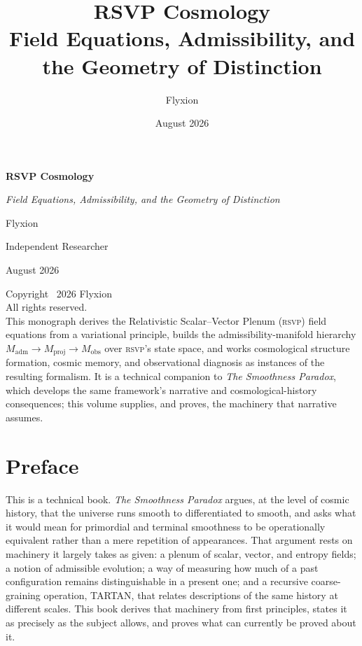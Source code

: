 \documentclass[12pt,a4paper,twoside,openright]{book}
\title{%
  \Huge\bfseries
  RSVP Cosmology\\[12pt]
  \Large
  Field Equations, Admissibility, and the Geometry of Distinction
}
\author{%
  \Large Flyxion
}
\date{August 2026}
\theoremstyle{plain}
\theoremstyle{definition}
\theoremstyle{remark}
\newcommand{\Mad}{M_{\mathrm{adm}}}
\newcommand{\Mproj}{M_{\mathrm{proj}}}
\newcommand{\Mobs}{M_{\mathrm{obs}}}
\newcommand{\RSVP}{\textsc{rsvp}}
\begin{document}

\frontmatter

\begin{titlepage}
\centering
\vspace*{2cm}

{\Huge\bfseries RSVP Cosmology\par}
\vspace{1cm}
{\Large\itshape Field Equations, Admissibility, and the Geometry of Distinction\par}

\vfill

{\Large Flyxion\par}
\vspace{0.5cm}
{\large Independent Researcher\par}

\vfill

{\large August 2026\par}

\end{titlepage}

\thispagestyle{empty}
\null\vfill
\noindent
Copyright \textcopyright\ 2026 Flyxion\\[12pt]
\noindent
All rights reserved.\\[24pt]
\noindent
This monograph derives the Relativistic Scalar--Vector Plenum (\RSVP) field equations from a variational principle, builds the admissibility-manifold hierarchy $\Mad \to \Mproj \to \Mobs$ over \RSVP's state space, and works cosmological structure formation, cosmic memory, and observational diagnosis as instances of the resulting formalism. It is a technical companion to \emph{The Smoothness Paradox}, which develops the same framework's narrative and cosmological-history consequences; this volume supplies, and proves, the machinery that narrative assumes.

\clearpage

\tableofcontents
\clearpage

\listoffigures
\clearpage

\chapter*{Preface}

This is a technical book. \emph{The Smoothness Paradox} argues, at the level of cosmic history, that the universe runs smooth to differentiated to smooth, and asks what it would mean for primordial and terminal smoothness to be operationally equivalent rather than a mere repetition of appearances. That argument rests on machinery it largely takes as given: a plenum of scalar, vector, and entropy fields; a notion of admissible evolution; a way of measuring how much of a past configuration remains distinguishable in a present one; and a recursive coarse-graining operation, TARTAN, that relates descriptions of the same history at different scales. This book derives that machinery from first principles, states it as precisely as the subject allows, and proves what can currently be proved about it.
\end{document}
